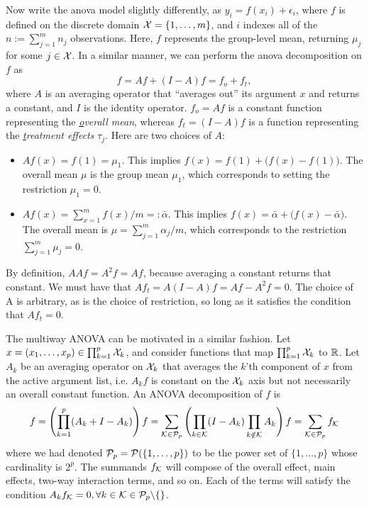 
Now write the \gls*{anova} model slightly differently, as $y_{i} = f(x_i) + \epsilon_{i}$, where $f$ is defined on the discrete domain ${\mathcal X} = \{1,\dots,m\}$, and $i$ indexes all of the $n := \sum_{j=1}^m n_j$ observations.
Here, $f$ represents the group-level mean, returning $\mu_j$ for some $j\in{\mathcal X}$.
In a similar manner, we can perform the \gls*{anova} decomposition on $f$ as
\[
  f = Af + (I-A)f = f_o + f_t,
\]
where $A$ is an averaging operator that ``averages out'' its argument $x$ and returns a constant, and $I$ is the identity operator.
$f_o = Af$ is a constant function representing the \textit{\underline{o}verall mean}, whereas $f_t = (I - A)f$ is a function representing the \textit{\underline{t}reatment effects} $\tau_j$.
Here are two choices of $A$:
\begin{itemize}
  \item {\boldmath$Af(x) = f(1) = \mu_1$}. This implies $f(x) = f(1) + \big(f(x) - f(1)\big)$. The overall mean $\mu$ is the group mean $\mu_1$, which corresponds to setting the restriction $\mu_1=0$.
  \item {\boldmath$Af(x) = \sum_{x=1}^m f(x) / m =: \bar \alpha$}. This implies $f(x) = \bar \alpha + \big( f(x) - \bar \alpha \big)$. The overall mean is $\mu = \sum_{j=1}^m \alpha_j/m$, which corresponds to the restriction $\sum_{j=1}^m \mu_j = 0$.
\end{itemize}
By definition, $AAf = A^2f = Af$, because averaging a constant returns that constant.
We must have that $Af_t = A(I - A)f = Af - A^2f = 0$.
The choice of A is arbitrary, as is the choice of restriction, so long as it satisfies the condition that $Af_t = 0$.

The multiway ANOVA can be motivated in a similar fashion. 
Let $x = (x_1,\dots,x_p) \in \prod_{k=1}^p {\mathcal X}_k$, and consider functions that map $\prod_{k=1}^p {\mathcal X}_k$ to $\mathbb{R}$.
Let $A_k$ be an averaging operator on ${\mathcal X}_k$ that averages the $k$'th component of $x$ from the active argument list, i.e. $A_kf$ is constant on the ${\mathcal X}_k$ axis but not necessarily an overall constant function.
An ANOVA decomposition of $f$ is
\begin{equation}
  f = \left( \prod_{k=1}^p (A_k + I - A_k) \right)f = \sum_{{\mathcal K}\in{\mathcal P}_p} \left( \prod_{k\in{\mathcal K}} (I - A_k) \prod_{k\notin{\mathcal K}} A_k \right)f = \sum_{{\mathcal K}\in{\mathcal P}_p} f_{\mathcal K}
\end{equation}
where we had denoted ${\mathcal P}_p = {\mathcal P}(\{1,\dots,p\})$ to be the power set of $\{1,\dots,p\}$ whose cardinality is $2^p$.
The summands $f_{\mathcal K}$ will compose of the overall effect, main effects, two-way interaction terms, and so on.
Each of the terms will satisfy the condition $A_kf_{\mathcal K} = 0, \forall k \in {\mathcal K} \in {\mathcal P}_p \backslash \{\}$.

